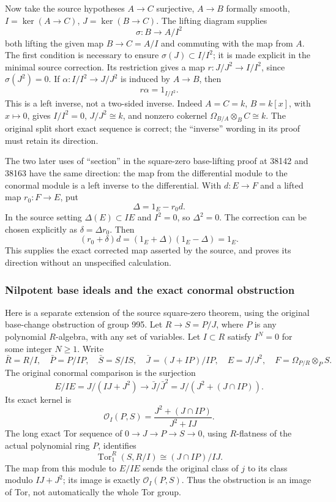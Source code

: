 Now take the source hypotheses \(A\to C\) surjective, \(A\to B\) formally smooth, \(I=\ker(A\to C)\), \(J=\ker(B\to C)\). The lifting diagram supplies \[
\sigma:B\longrightarrow A/I^2
\] both lifting the given map \(B\to C=A/I\) and commuting with the map from \(A\). The first condition is necessary to ensure \(\sigma(J)\subset I/I^2\); it is made explicit in the minimal source correction. Its restriction gives a map \(r:J/J^2\to I/I^2\), since \(\sigma(J^2)=0\). If \(\alpha:I/I^2\to J/J^2\) is induced by \(A\to B\), then \[
r\alpha=1_{I/I^2}.
\] This is a left inverse, not a two-sided inverse. Indeed \(A=C=k\), \(B=k[x]\), with \(x\mapsto0\), gives \(I/I^2=0\), \(J/J^2\cong k\), and nonzero cokernel \(\Omega_{B/A}\otimes_BC\cong k\). The original split short exact sequence is correct; the ``inverse'' wording in its proof must retain its direction.

The two later uses of ``section'' in the square-zero base-lifting proof at 38142 and 38163 have the same direction: the map from the differential module to the conormal module is a left inverse to the differential. With \(d:E\to F\) and a lifted map \(r_0:F\to E\), put \[
\Delta=1_E-r_0d.
\] In the source setting \(\Delta(E)\subset IE\) and \(I^2=0\), so \(\Delta^2=0\). The correction can be chosen explicitly as \(\delta=\Delta r_0\). Then \[
(r_0+\delta)d=(1_E+\Delta)(1_E-\Delta)=1_E.
\] This supplies the exact corrected map asserted by the source, and proves its direction without an unspecified calculation.

\subsubsection{Nilpotent base ideals and the exact conormal obstruction}\label{algebra-proof-048-nilpotent-base-ideals-and-the-exact-conormal-obstruction}

Here is a separate extension of the source square-zero theorem, using the original base-change obstruction of group 995. Let \(R\to S=P/J\), where \(P\) is any polynomial \(R\)-algebra, with any set of variables. Let \(I\subset R\) satisfy \(I^N=0\) for some integer \(N\ge1\). Write \[
\bar R=R/I,\quad \bar P=P/IP,\quad \bar S=S/IS,\quad
\bar J=(J+IP)/IP,\quad E=J/J^2,\quad F=\Omega_{P/R}\otimes_PS.
\] The original conormal comparison is the surjection \[
E/IE=J/(IJ+J^2)\longrightarrow
\bar J/\bar J^2=J/(J^2+(J\cap IP)).
\] Its exact kernel is \[
\mathcal O_I(P,S)=\frac{J^2+(J\cap IP)}{J^2+IJ}.
\] The long exact Tor sequence of \(0\to J\to P\to S\to0\), using \(R\)-flatness of the actual polynomial ring \(P\), identifies \[
\operatorname{Tor}_1^R(S,R/I)\cong (J\cap IP)/IJ.
\] The map from this module to \(E/IE\) sends the original class of \(j\) to its class modulo \(IJ+J^2\); its image is exactly \(\mathcal O_I(P,S)\). Thus the obstruction is an image of Tor, not automatically the whole Tor group.

